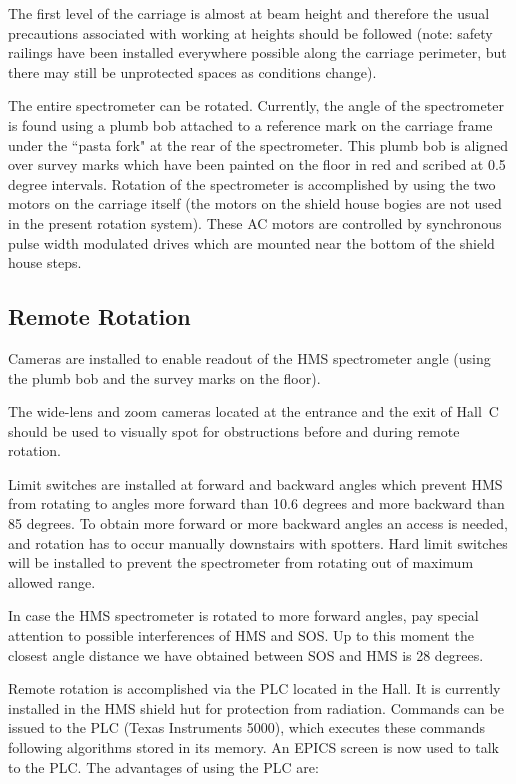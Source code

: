 {The first level of the carriage is almost at beam height and therefore
the usual precautions associated with working at heights should be followed (note:
safety railings have been installed everywhere possible along the carriage
perimeter, but there may still be unprotected spaces as conditions change).

The entire spectrometer can be rotated. Currently, the angle of the spectrometer
is found using a plumb bob attached to a reference mark on the
carriage frame under the ``pasta fork" at the rear of the spectrometer.
This plumb bob is aligned over survey marks which have been painted
on the floor in red and scribed at 0.5 degree intervals. Rotation of the spectrometer
is accomplished by using the two motors on the carriage itself (the motors on
the shield house bogies are not used in the present rotation system).
These AC motors are controlled by synchronous pulse width modulated
drives which are mounted near the bottom of the shield house steps.

\subsection{Remote Rotation}

Cameras are installed to enable readout of the HMS spectrometer angle
(using the plumb bob and the survey marks on the floor).

The wide-lens and zoom cameras located at the entrance and
the exit of Hall~C should be used to visually spot for obstructions
before and during remote rotation.

Limit switches are installed at forward
and backward angles which prevent HMS from rotating to angles more forward than
10.6 degrees and more backward than 85 degrees. To obtain more forward or more
backward angles an access is needed, and rotation has to occur manually
downstairs with spotters. Hard limit switches will be installed to prevent
the spectrometer from rotating out of maximum allowed range.

In case the HMS spectrometer is rotated to more forward angles, pay special
attention to possible interferences of HMS and SOS. Up to this moment
the closest  angle distance we have obtained between SOS and HMS is 28 degrees.

Remote rotation  is accomplished via the PLC located in the Hall.  It
is currently installed in the HMS shield hut for protection from
radiation.  Commands can be issued to the PLC (Texas Instruments 5000), which executes these commands
following algorithms stored in its memory. An EPICS screen is now
used to talk to the PLC.  The advantages of using the PLC are:

}
